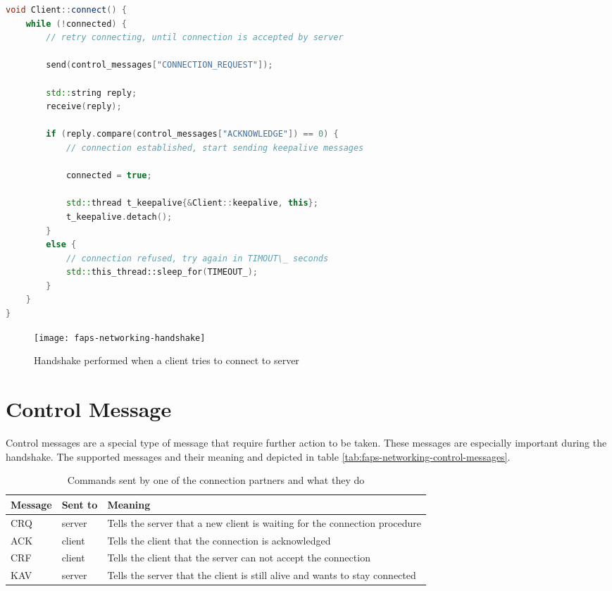 \begin{minipage}{\linewidth}
\begin{lstlisting}[caption={Client handshake method}, label=lst:faps-networking-handshake-client, captionpos=b, language=C++]
void Client::connect() {
    while (!connected) {
        // retry connecting, until connection is accepted by server

        send(control_messages["CONNECTION_REQUEST"]);

        std::string reply;
        receive(reply);

        if (reply.compare(control_messages["ACKNOWLEDGE"]) == 0) {
            // connection established, start sending keepalive messages

            connected = true;

            std::thread t_keepalive{&Client::keepalive, this};
            t_keepalive.detach();
        }
        else {
            // connection refused, try again in TIMOUT\_ seconds
            std::this_thread::sleep_for(TIMEOUT_);
        }
    }
}
\end{lstlisting}
\end{minipage}

\begin{figure}[H]
    \centering
    \texttt{[image: faps-networking-handshake]}
    \caption{Handshake performed when a client tries to connect to server}
    \label{fig:faps-networking-handshake}
\end{figure}

\section{Control Message}

Control messages are a special type of message that require further action to be taken. These messages are especially important during the handshake. The supported messages and their meaning and depicted in table \vref{tab:faps-networking-control-messages}.

\begin{table}[H]
    \centering
    \begin{tabular}{| l | l | p{5cm} |}
    \hline
    \textbf{Message} & \textbf{Sent to} & \textbf{Meaning} \\ \hline
    CRQ & server & Tells the server that a new client is waiting for the connection procedure \\ \hline
    ACK & client & Tells the client that the connection is acknowledged \\ \hline
    CRF & client & Tells the client that the server can not accept the connection \\ \hline
    KAV & server & Tells the server that the client is still alive and wants to stay connected \\
    \hline
    \end{tabular}
    \caption{Commands sent by one of the connection partners and what they do}
    \label{tab:faps-networking-control-messages}
\end{table}

